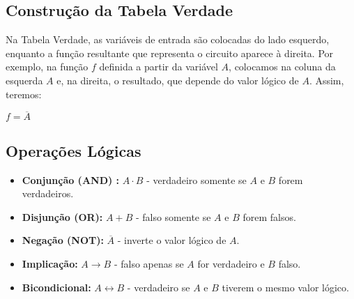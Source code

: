 \documentclass[12pt]{article}
\begin{document}
\subsection{Construção da Tabela Verdade}
Na Tabela Verdade, as variáveis de entrada são colocadas do lado esquerdo, enquanto a função resultante que representa o circuito aparece à direita.
Por exemplo, na função $f$ definida a partir da variável $A$, colocamos na coluna da esquerda $A$ e, na direita, o resultado, que depende do valor lógico de $A$. Assim, teremos:

\begin{center}
$ f = \overline{A}$
\vspace{0.5em}
\end{center}

\subsection{Operações Lógicas}
\begin{itemize}
   \item \textbf{Conjunção (AND) :} \( A \cdot B \) - verdadeiro somente se \( A \) e \( B \) forem verdadeiros.
   \item \textbf{Disjunção (OR):} \( A + B \) - falso somente se \( A\) e \( B \) forem falsos.
   \item \textbf{Negação (NOT):} \( \overline{A} \) - inverte o valor lógico de \( A \).
   \item \textbf{Implicação:} \( A \rightarrow B \) - falso apenas se \( A \) for verdadeiro e \( B \) falso.
   \item \textbf{Bicondicional:} \( A \leftrightarrow B \) - verdadeiro se \( A \) e \( B \) tiverem o mesmo valor lógico.
\end{itemize}
\end{document}
